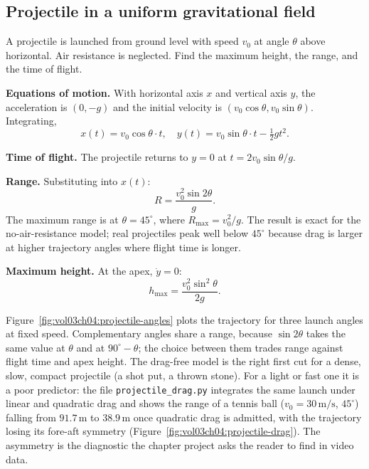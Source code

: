 \subsection{Projectile in a uniform gravitational field}

A projectile is launched from ground level with speed $v_0$ at angle
$\theta$ above horizontal. Air resistance is neglected. Find the
maximum height, the range, and the time of flight.

\textbf{Equations of motion.} With horizontal axis $x$ and vertical
axis $y$, the acceleration is $(0, -g)$ and the initial velocity is
$(v_0 \cos\theta, v_0 \sin\theta)$. Integrating,
\[
x(t) = v_0 \cos\theta \cdot t, \quad y(t) = v_0 \sin\theta \cdot t -
\tfrac{1}{2} g t^2.
\]

\textbf{Time of flight.} The projectile returns to $y = 0$ at $t = 2
v_0 \sin\theta / g$.

\textbf{Range.} Substituting into $x(t)$:
\[
R = \frac{v_0^2 \sin 2\theta}{g}.
\]
The maximum range is at $\theta = 45^{\circ}$, where $R_{\max} = v_0^2
/ g$. The result is exact for the no-air-resistance model; real
projectiles peak well below $45^{\circ}$ because drag is larger at
higher trajectory angles where flight time is longer.

\textbf{Maximum height.} At the apex, $\dot{y} = 0$:
\[
h_{\max} = \frac{v_0^2 \sin^2\theta}{2g}.
\]



Figure~\ref{fig:vol03ch04:projectile-angles} plots the trajectory for
three launch angles at fixed speed. Complementary angles share a
range, because $\sin 2\theta$ takes the same value at $\theta$ and at
$90^{\circ}-\theta$; the choice between them trades range against
flight time and apex height. The drag-free model is the right first
cut for a dense, slow, compact projectile (a shot put, a thrown
stone). For a light or fast one it is a poor predictor: the file
\texttt{projectile\_drag.py} integrates the same launch under linear
and quadratic drag and shows the range of a tennis ball
($v_{0}=30\,\si{\meter\per\second}$, $45^{\circ}$) falling from
$91.7\,\si{\meter}$ to $38.9\,\si{\meter}$ once quadratic drag is
admitted, with the trajectory losing its fore-aft symmetry
(Figure~\ref{fig:vol03ch04:projectile-drag}). The asymmetry is the
diagnostic the chapter project asks the reader to find in video data.




